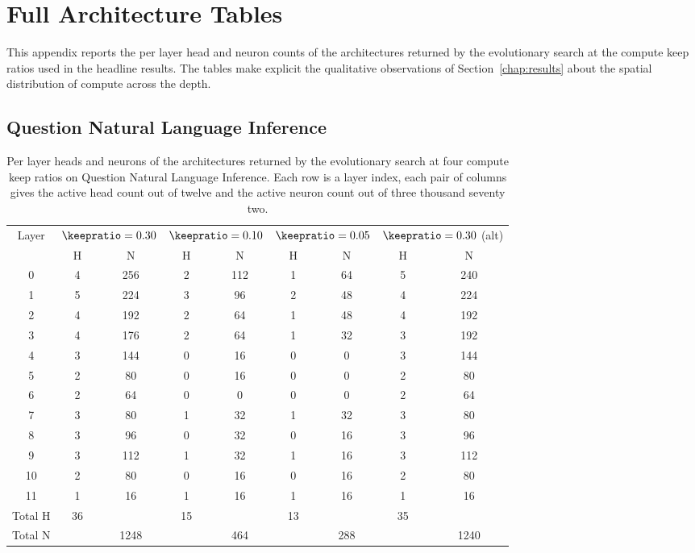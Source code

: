 \section{Full Architecture Tables}
\label{app:archtables}

This appendix reports the per layer head and neuron counts of the architectures returned by the evolutionary search at the compute keep ratios used in the headline results. The tables make explicit the qualitative observations of Section~\ref{chap:results} about the spatial distribution of compute across the depth.

\subsection{Question Natural Language Inference}

\begin{table}[h]
\centering
\caption{Per layer heads and neurons of the architectures returned by the evolutionary search at four compute keep ratios on Question Natural Language Inference. Each row is a layer index, each pair of columns gives the active head count out of twelve and the active neuron count out of three thousand seventy two.}
\begin{tabular}{ccccccccc}
\toprule
Layer & \multicolumn{2}{c}{$\keepratio = 0.30$} & \multicolumn{2}{c}{$\keepratio = 0.10$} & \multicolumn{2}{c}{$\keepratio = 0.05$} & \multicolumn{2}{c}{$\keepratio = 0.30$ (alt)} \\
& H & N & H & N & H & N & H & N \\
\midrule
0  & 4 & 256 & 2 & 112 & 1 & 64  & 5 & 240 \\
1  & 5 & 224 & 3 & 96  & 2 & 48  & 4 & 224 \\
2  & 4 & 192 & 2 & 64  & 1 & 48  & 4 & 192 \\
3  & 4 & 176 & 2 & 64  & 1 & 32  & 3 & 192 \\
4  & 3 & 144 & 0 & 16  & 0 & 0   & 3 & 144 \\
5  & 2 & 80  & 0 & 16  & 0 & 0   & 2 & 80  \\
6  & 2 & 64  & 0 & 0   & 0 & 0   & 2 & 64  \\
7  & 3 & 80  & 1 & 32  & 1 & 32  & 3 & 80  \\
8  & 3 & 96  & 0 & 32  & 0 & 16  & 3 & 96  \\
9  & 3 & 112 & 1 & 32  & 1 & 16  & 3 & 112 \\
10 & 2 & 80  & 0 & 16  & 0 & 16  & 2 & 80  \\
11 & 1 & 16  & 1 & 16  & 1 & 16  & 1 & 16  \\
\midrule
Total H & 36 & & 15 & & 13 & & 35 \\
Total N & & 1248 & & 464 & & 288 & & 1240 \\
\bottomrule
\end{tabular}
\end{table}

